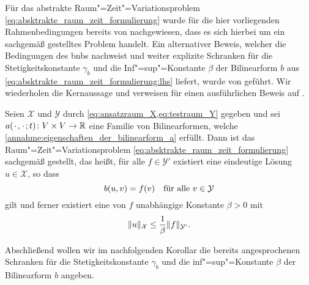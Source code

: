 Für das abstrakte Raum"=Zeit"=Variationsproblem \cref{eq:absktrakte_raum_zeit_formulierung} wurde für die hier vorliegenden Rahmenbedingungen bereits von \textcite[Section XVIII.3]{Dautray:1992by} nachgewiesen, dass es sich hierbei um ein sachgemäß gestelltes Problem handelt.
Ein alternativer Beweis, welcher die Bedingungen des \acl{bnb}s nachweist und weiter explizite Schranken für die Stetigkeitskonstante $\gamma_{b}$ und die Inf"=sup"=Konstante $\beta$ der Bilinearform $b$ aus \cref{eq:absktrakte_raum_zeit_formulierung:lhs} liefert, wurde von \textcite{Schwab:2009ec} geführt.
Wir wiederholen die Kernaussage \cite[Theorem 5.1]{Schwab:2009ec} und verweisen für einen ausführlichen Beweis auf \cite[Appendix A]{Schwab:2009ec}.

\begin{Satz}
\label{satz:ss09:theorem51}
    Seien $\mathcal X$ und $\mathcal Y$ durch \cref{eq:ansatzraum_X,eq:testraum_Y} gegeben und sei $a(\blank, \blank; t) \colon V \times V \to \mathbb{R}$ eine Familie von Bilinearformen, welche \cref{annahme:eigenschaften_der_bilinearform_a} erfüllt.
    Dann ist das Raum"=Zeit"=Variationsproblem \cref{eq:absktrakte_raum_zeit_formulierung} sachgemäß gestellt, das heißt, für alle $f \in \mathcal Y'$ existiert eine eindeutige Lösung $u \in \mathcal X$, so dass
    \begin{equation}
        b(u, v) = f(v) \quad \fa v \in \mathcal Y
    \end{equation}
    gilt und ferner existiert eine von $f$ unabhängige Konstante $\beta > 0$ mit
    \begin{equation}
        \norm{u}_{\mathcal X} \leq \frac{1}{\beta} \norm{f}_{\mathcal Y'}.
    \end{equation}
\end{Satz}

Abschließend wollen wir im nachfolgenden Korollar die bereits angesprochenen Schranken für die Stetigkeitskonstante $\gamma_{b}$ und die inf"=sup"=Konstante $\beta$ der Bilinearform $b$ angeben.

